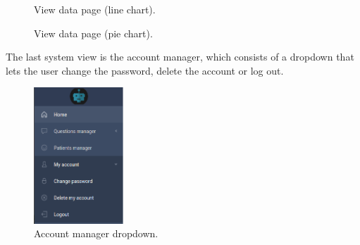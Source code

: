 \documentclass[12pt,english]{article}
\begin{document}
\begin{figure}[H]
    \caption{View data page (line chart).}
\end{figure}

\begin{figure}[H]
    \caption{View data page (pie chart).}
\end{figure}

The last system view is the account manager, which consists of a dropdown that lets the user change the password, delete the account or log out.

\begin{figure}[H]
    \centering
    \includegraphics[width=0.3\textwidth]{account_dropdown.png}
    \caption{Account manager dropdown.}
\end{figure}
\end{document}
